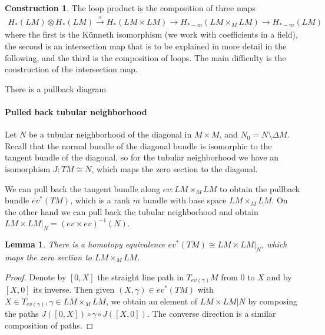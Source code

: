 \documentclass{scrartcl}
\theoremstyle{plain}
\newtheorem{lemma}[theorem]{Lemma}
\theoremstyle{definition}
\newtheorem{construction}[theorem]{Construction}
\newcommand{\iso}{\cong}
\newcommand{\defeq}{\coloneqq}
\let\xto\xrightarrow
\let\xfrom\xleftarrow
\begin{document}
\begin{construction}
The loop product is the composition of three maps
\begin{align*}
    H_*(LM)\otimes H_*(LM)\xto{\times} H_{*}(LM\times LM)\xto{} H_{*-m}(LM\times_M LM)\to H_{*-m}(LM)
\end{align*}
where the first is the Künneth isomorphism (we work with coefficients in a field), the second is an intersection map that is to be explained in more detail in the following, and the third is the composition of loops. The main difficulty is the construction of the intersection map.
\end{construction}

There is a pullback diagram

\begin{center}
\end{center}





\paragraph{Pulled back tubular neighborhood} Let $N$ be a tubular neighborhood of the diagonal in $M\times M$, and $N_0 = N\setminus \Delta M$. Recall that the normal bundle of the diagonal bundle is isomorphic to the tangent bundle of the diagonal, so for the tubular neighborhood we have an isomorphism $J\colon TM\iso N$, which maps the zero section to the diagonal. 

We can pull back the tangent bundle along $ev\colon LM\times_M LM$ to obtain the pullback bundle $ev^*(TM)$, which is a rank $m$ bundle with base space $LM\times_M LM$. On the other hand we can pull back the tubular neighborhood and obtain $LM\times LM|_N = (ev\times ev)^{-1}(N)$. \begin{lemma}
    There is a homotopy equivalence $ev^*(TM) \iso LM\times LM|_N$, which maps the zero section to $LM\times_M LM$. 
\end{lemma}
\begin{proof}
    Denote by $[0, X]$ the straight line path in $T_{ev(\gamma)}M$ from $0$ to $X$ and by $[X, 0]$ its inverse. Then given $(X, \gamma)\in ev^*(TM)$ with $X\in T_{ev(\gamma)}, \gamma\in LM\times_M LM$, we obtain an element of $LM\times LM|N$ by composing the paths $J([0, X]) \circ \gamma \circ J([X, 0])$. The converse direction is a similar composition of paths.
\end{proof}
\end{document}
